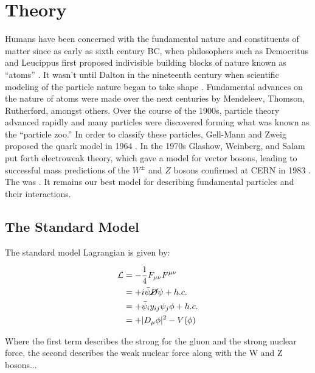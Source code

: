 \chapter{Theory}

    Humans have been concerned with the fundamental nature and constituents of matter since as early as sixth century BC, when philosophers such as Democritus and Leucippus first proposed indivisible building blocks of nature known as ``atoms'' \cite{democritus}. It wasn't until Dalton in the nineteenth century when scientific modeling of the particle nature began to take shape \cite{dalton}. Fundamental advances on the nature of atoms were made over the next centuries by Mendeleev, Thomson, Rutherford, amongst others. Over the course of the 1900s, particle theory advanced rapidly and many particles were discovered forming what was known as the ``particle zoo.'' In order to classify these particles, Gell-Mann and Zweig proposed the quark model in 1964 \cite{quark-model}. In the 1970s Glashow, Weinberg, and Salam put forth electroweak theory, which gave a model for vector bosons, leading to successful mass predictions of the $W^{\pm}$ and $Z$ bosons confirmed at \gls{CERN} in 1983 \cite{w-discovery, z-discovery}. The  was . It remains our best model for describing fundamental particles and their interactions.
    

    \section{The Standard Model}

        The standard model Lagrangian is given by:

        \begin{equation}
            \begin{aligned}
                \mathcal{L} &= - \frac{1}{4} F_{\mu \nu} F^{\mu \nu} \\
                &=+ i \bar{\psi} \cancel{D} \psi + h.c. \\
                &=+ \bar{\psi}_i y_{ij} \psi_j \phi + h.c. \\
                &=+ |D_\mu \phi|^2 - V(\phi)
            \end{aligned}
        \end{equation}

        Where the first term describes the strong for the gluon and the strong nuclear force, the second describes the weak nuclear force along with the W and Z bosons... 




